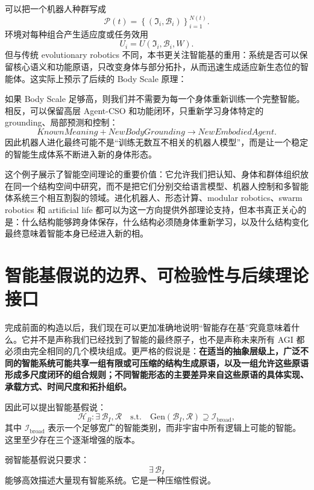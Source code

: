 可以把一个机器人种群写成
\[
\mathcal P(t)
=
\left\{
(\mathfrak I_i,\mathcal B_i)
\right\}_{i=1}^{N(t)}.
\]
环境对每种组合产生适应度或任务效用
\[
U_i
=
U(
\mathfrak I_i,
\mathcal B_i,
W
).
\]
但与传统 evolutionary robotics 不同，本书更关注智能基的重用：系统是否可以保留核心语义和功能原语，只改变身体与部分拓扑，从而迅速生成适应新生态位的智能体。这实际上预示了后续的 Body Scale 原理：
\begin{statementbox}
\centering
{}
\end{statementbox}

如果 Body Scale 足够高，则我们并不需要为每一个身体重新训练一个完整智能。相反，可以保留高层 Agent-CSO 和功能闭环，只重新学习身体特定的 grounding、局部预测和控制：
\[
KnownMeaning
+
NewBodyGrounding
\rightarrow
NewEmbodiedAgent.
\]
因此机器人进化最终可能不是“训练无数互不相关的机器人模型”，而是让一个稳定的智能生成体系不断进入新的身体形态。

这个例子展示了智能空间理论的重要价值：它允许我们把认知、身体和群体组织放在同一个结构空间中研究，而不是把它们分别交给语言模型、机器人控制和多智能体系统三个相互割裂的领域。进化机器人、形态计算、modular robotics、swarm robotics 和 artificial life 都可以为这一方向提供外部理论支持，但本书真正关心的是：什么结构能够跨身体保存，什么结构必须随身体重新学习，以及什么结构变化最终意味着智能本身已经进入新的相。

\section{智能基假说的边界、可检验性与后续理论接口}

完成前面的构造以后，我们现在可以更加准确地说明“智能存在基”究竟意味着什么。它并不是声称我们已经找到了智能的最终原子，也不是声称未来所有 AGI 都必须由完全相同的几个模块组成。更严格的假说是：\textbf{在适当的抽象层级上，广泛不同的智能系统可能共享一组有限或可压缩的结构生成原语，以及一组允许这些原语形成多尺度闭环的组合规则；不同智能形态的主要差异来自这些原语的具体实现、承载方式、时间尺度和拓扑组织。}

因此可以提出智能基假说：
\[
\boxed{
\mathcal H_B:
\exists\,\mathcal B_I,\mathcal R
\quad
\mathrm{s.t.}
\quad
\mathrm{Gen}(\mathcal B_I,\mathcal R)
\supseteq
\mathscr I_{\mathrm{broad}},
}
\]
其中 $\mathscr I_{\mathrm{broad}}$ 表示一个足够宽广的智能类别，而非宇宙中所有逻辑上可能的智能。这里至少存在三个逐渐增强的版本。

弱智能基假说只要求：
\[
\exists\,\mathcal B_I
\]
能够高效描述大量现有智能系统。它是一种压缩性假说。


